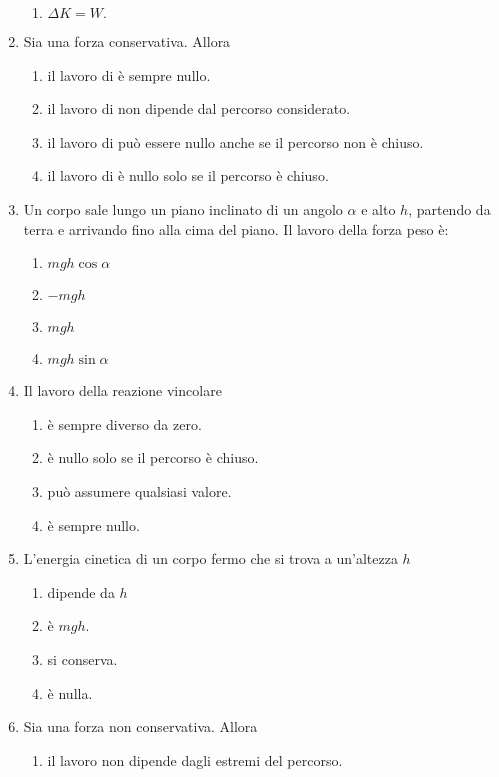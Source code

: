 \documentclass{article}
\begin{document}
\begin{enumerate}
\begin{enumerate}[label=\Alph*.]
    \item $\Delta K=W.$
  \end{enumerate}
  \item Sia  una forza conservativa. Allora
  \begin{enumerate}[label=\Alph*.]
    \item il lavoro di  è sempre nullo.
    \item il lavoro di  non dipende dal percorso considerato.
    \item il lavoro di  può essere nullo anche se il percorso non è chiuso.
    \item il lavoro di  è nullo solo se il percorso è chiuso.
  \end{enumerate}
  \item Un corpo sale lungo un piano inclinato di un angolo $\alpha$ e alto $h$, partendo da terra e arrivando fino alla cima del piano. Il lavoro della forza peso è:
  \begin{enumerate}[label=\Alph*.]
    \item $mgh\cos\alpha$
    \item $-mgh$
    \item $mgh$
    \item $mgh\sin\alpha$
  \end{enumerate}
  \item Il lavoro della reazione vincolare
  \begin{enumerate}[label=\Alph*.]
    \item è sempre diverso da zero.
    \item è nullo solo se il percorso è chiuso.
    \item può assumere qualsiasi valore.
    \item è sempre nullo.
  \end{enumerate}
  \item L'energia cinetica di un corpo fermo che si trova a un'altezza $h$
  \begin{enumerate}[label=\Alph*.]
    \item dipende da $h$
    \item è $mgh$.
    \item si conserva.
    \item è nulla.
  \end{enumerate}
  \item Sia  una forza non conservativa. Allora
  \begin{enumerate}[label=\Alph*.]
    \item il lavoro non dipende dagli estremi del percorso.

\end{enumerate}
\end{enumerate}
\end{document}
